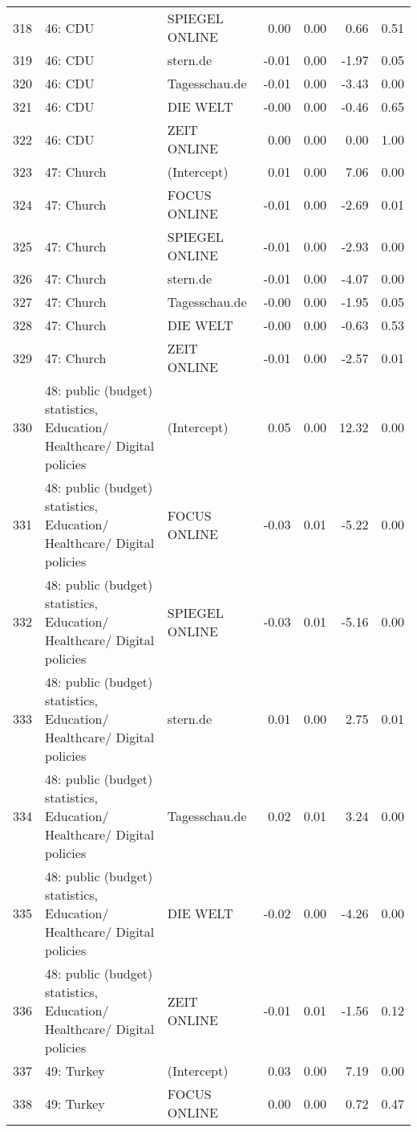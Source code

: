 \begin{table}[ht]
{\begin{tabular}{rllrrrr}
  318 & 46: CDU & SPIEGEL ONLINE & 0.00 & 0.00 & 0.66 & 0.51 \\ 
  319 & 46: CDU & stern.de & -0.01 & 0.00 & -1.97 & 0.05 \\ 
  320 & 46: CDU & Tagesschau.de & -0.01 & 0.00 & -3.43 & 0.00 \\ 
  321 & 46: CDU & DIE WELT & -0.00 & 0.00 & -0.46 & 0.65 \\ 
  322 & 46: CDU & ZEIT ONLINE & 0.00 & 0.00 & 0.00 & 1.00 \\ 
  323 & 47: Church & (Intercept) & 0.01 & 0.00 & 7.06 & 0.00 \\ 
  324 & 47: Church & FOCUS ONLINE & -0.01 & 0.00 & -2.69 & 0.01 \\ 
  325 & 47: Church & SPIEGEL ONLINE & -0.01 & 0.00 & -2.93 & 0.00 \\ 
  326 & 47: Church & stern.de & -0.01 & 0.00 & -4.07 & 0.00 \\ 
  327 & 47: Church & Tagesschau.de & -0.00 & 0.00 & -1.95 & 0.05 \\ 
  328 & 47: Church & DIE WELT & -0.00 & 0.00 & -0.63 & 0.53 \\ 
  329 & 47: Church & ZEIT ONLINE & -0.01 & 0.00 & -2.57 & 0.01 \\ 
  330 & 48: public (budget) statistics, Education/ Healthcare/ Digital policies & (Intercept) & 0.05 & 0.00 & 12.32 & 0.00 \\ 
  331 & 48: public (budget) statistics, Education/ Healthcare/ Digital policies & FOCUS ONLINE & -0.03 & 0.01 & -5.22 & 0.00 \\ 
  332 & 48: public (budget) statistics, Education/ Healthcare/ Digital policies & SPIEGEL ONLINE & -0.03 & 0.01 & -5.16 & 0.00 \\ 
  333 & 48: public (budget) statistics, Education/ Healthcare/ Digital policies & stern.de & 0.01 & 0.00 & 2.75 & 0.01 \\ 
  334 & 48: public (budget) statistics, Education/ Healthcare/ Digital policies & Tagesschau.de & 0.02 & 0.01 & 3.24 & 0.00 \\ 
  335 & 48: public (budget) statistics, Education/ Healthcare/ Digital policies & DIE WELT & -0.02 & 0.00 & -4.26 & 0.00 \\ 
  336 & 48: public (budget) statistics, Education/ Healthcare/ Digital policies & ZEIT ONLINE & -0.01 & 0.01 & -1.56 & 0.12 \\ 
  337 & 49: Turkey & (Intercept) & 0.03 & 0.00 & 7.19 & 0.00 \\ 
  338 & 49: Turkey & FOCUS ONLINE & 0.00 & 0.00 & 0.72 & 0.47 \\ 

\end{tabular}}
\end{table}
